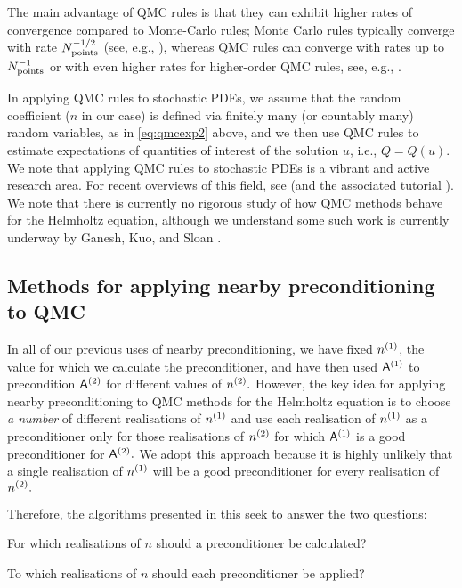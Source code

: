 The main advantage of QMC rules is that they can exhibit higher rates of convergence compared to Monte-Carlo rules; Monte Carlo rules typically converge with rate $N_{\mathrm{points}}^{-1/2}$ (see, e.g., \cite[Section 1.1]{Gi:15}), whereas QMC rules can converge with rates up to $N_{\mathrm{points}}^{-1}$  or with even higher rates for higher-order QMC rules, see, e.g., \cite[Penultimate paragraph of Section 1.2]{KuNu:16}.

In applying QMC rules to stochastic PDEs, we assume that the random coefficient ($n$ in our case) is defined via finitely many (or countably many) random variables, as in \cref{eq:qmcexp2} above, and we then use QMC rules to estimate expectations of quantities of interest of the solution $u$, i.e., $Q = Q(u).$ We note that applying QMC rules to stochastic PDEs is a vibrant and active research area. For recent overviews of this field, see \cite{KuNu:16,KuNu:18b} (and the associated tutorial \cite{KuNu:18a}). We note that there is currently no rigorous study of how QMC methods behave for the Helmholtz equation, although we understand some such work is currently underway by Ganesh, Kuo, and Sloan \cite{GaKuSl}.

\subsection{Methods for applying nearby preconditioning to QMC}\label{sec:nbpcqmcnum}
In all of our previous uses of nearby preconditioning, we have fixed ${n}^{(1)}$, the value for which we calculate the preconditioner, and have then used $\mathsf{A}^{(1)}$ to precondition $\mathsf{A}^{(2)}$ for different values of ${n}^{(2)}.$ However, the key idea for applying nearby preconditioning to QMC methods for the Helmholtz equation is to choose \emph{a number} of different realisations of ${n}^{(1)}$ and use each realisation of ${n}^{(1)}$ as a preconditioner only for those  realisations of ${n}^{(2)}$ for which $\mathsf{A}^{(1)}$ is a good preconditioner for $\mathsf{A}^{(2)}.$ We adopt this approach because it is highly unlikely that a single realisation of ${n}^{(1)}$ will be a good preconditioner for every realisation of ${n}^{(2)}.$

Therefore, the algorithms presented in this  seek to answer the two questions:
\ben
\item For which realisations of $n$ should a preconditioner be calculated?
  \item To which realisations of $n$ should each preconditioner be applied?
\een

